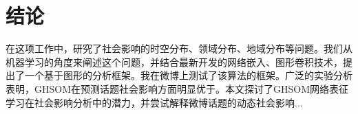 
\chapter{结论}
\label{chap:conclusion}

在这项工作中，研究了社会影响的时空分布、领域分布、地域分布等问题。我们从机器学习的角度来阐述这个问题，并结合最新开发的网络嵌入、图形卷积技术，提出了一个基于图形的分析框架。我在微博上测试了该算法的框架。广泛的实验分析表明，GHSOM在预测话题社会影响方面明显优于。本文探讨了GHSOM网络表征学习在社会影响分析中的潜力，并尝试解释微博话题的动态社会影响...
